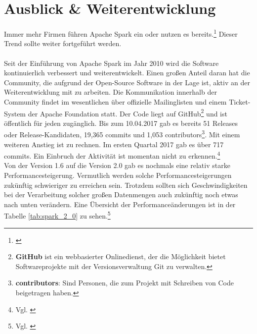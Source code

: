 \newpage
\chapter{Ausblick \& Weiterentwicklung} 

Immer mehr Firmen führen Apache Spark ein oder nutzen es bereits.\footnote{\cite{HEISEBIGDATA}} Dieser Trend sollte weiter fortgeführt werden.
\\ \\
\noindent
Seit der Einführung von Apache Spark im Jahr 2010 wird die Software kontinuierlich verbessert und weiterentwickelt. 
Einen großen Anteil daran hat die Community, die aufgrund der Open-Source Software in der Lage ist, aktiv an der Weiterentwicklung mit zu arbeiten. 
Die Kommunikation innerhalb der Community findet im wesentlichen über offizielle Mailinglisten und einem Ticket-System der Apache Foundation statt.
Der Code liegt auf GitHub\footnote{\textbf{GitHub} ist ein webbasierter Onlinedienst, der die Möglichkeit bietet Softwareprojekte mit der Versionsverwaltung Git zu verwalten.} und ist öffentlich für jeden zugänglich. 
Bis zum 10.04.2017 gab es bereits 51 Releases oder Release-Kandidaten, 19,365 commits und 1,053 contributors\footnote{\textbf{contributors}: Sind Personen, die zum Projekt mit Schreiben von Code beigetragen haben.}.
Mit einem weiteren Anstieg ist zu rechnen. Im ersten Quartal 2017 gab es über 717 commits. Ein Einbruch der Aktivität ist momentan nicht zu erkennen.\footnote{Vgl. \cite{GITHUB}} \\


\noindent
Von der Version 1.6 auf die Version 2.0 gab es nochmals eine relativ starke Performancesteigerung. Vermutlich werden solche Performancesteigerungen zukünftig schwieriger zu erreichen sein. Trotzdem sollten sich  Geschwindigkeiten bei der Verarbeitung solcher großen Datenmengen auch zukünftig noch etwas nach unten verändern. Eine Übersicht der Performanceänderungen ist in der Tabelle \ref{tab:spark_2_0} zu sehen.\footnote{Vgl. \cite{DATABRICK_SPARK_2_0}}



